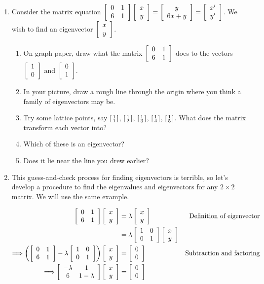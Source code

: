 \documentclass[../gatm.tex]{subfiles}
\begin{document}
\begin{enumerate}
\item Consider the matrix equation $\twomat{0}{1}{6}{1}\twovec{x}{y} = \twovec{y}{6x+y}=\twovec{x'}{y'}$. We wish to find an eigenvector $\twovec{x}{y}$.
\begin{enumerate}
\item On graph paper, draw what the matrix $\twomat{0}{1}{6}{1}$ does to the vectors $\twovec{1}{0}$ and $\twovec{0}{1}$.
\item In your picture, draw a rough line through the origin where you think a family of eigenvectors may be.
\item Try some lattice points, say $\stwovec{1}{1}$, $\stwovec{1}{2}$, $\stwovec{1}{3}$, $\stwovec{1}{4}$, $\stwovec{1}{5}$. What does the matrix transform each vector into?
\item Which of these is an eigenvector?
\item Does it lie near the line you drew earlier?
\end{enumerate}
\item This guess-and-check process for finding eigenvectors is terrible, so let's develop a procedure to find the eigenvalues and eigenvectors for any $2\times 2$ matrix. We will use the same example.

\begin{align*}
\twomat{0}{1}{6}{1}\twovec{x}{y} &= \lambda\twovec{x}{y} & \text{Definition of eigenvector} \\
&= \lambda\twomat{1}{0}{0}{1}\twovec{x}{y} \\
\Longrightarrow \left(\twomat{0}{1}{6}{1}-\lambda\twomat{1}{0}{0}{1}\right)\twovec{x}{y}&=\twovec{0}{0} & \text{Subtraction and factoring} \\
\Longrightarrow \twomat{-\lambda}{1}{6}{1-\lambda}\twovec{x}{y} &= \twovec{0}{0}
\end{align*}


\end{enumerate}
\end{document}
